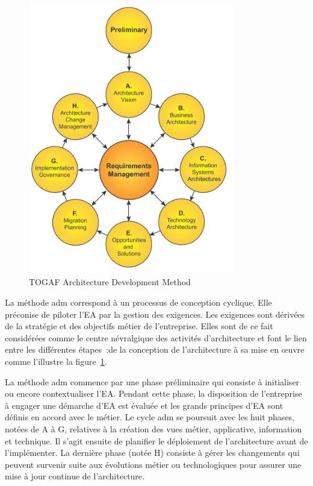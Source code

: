 \begin{figure}[!htbp]
    \begin{center}
    \includegraphics[width=0.8\textwidth]{figures/2_etat_de_l_art_EA/TOGAF9_Wheel.png}
    \end{center}
    \caption{TOGAF Architecture Development Method \protect\cite{togaf2009}}
    \label{fig:TOGAF}
\end{figure}

La méthode \gls{adm} correspond à un processus de conception cyclique. Elle préconise
de piloter l'EA par la gestion des exigences. Les exigences sont dérivées de la
stratégie et des objectifs métier de l'entreprise. Elles sont de ce fait
considérées comme le centre névralgique des activités d'architecture et font le
lien entre les différentes étapes~:de la conception de l'architecture à sa mise
en œuvre comme l'illustre la figure~\ref{fig:TOGAF}. 

La méthode \gls{adm} commence par une phase préliminaire qui consiste à initialiser
ou encore contextualiser l'EA. Pendant cette phase, la disposition de
l'entreprise à engager une démarche d'EA est évaluée et les grands principes
d'EA sont définis en accord avec le métier. Le cycle \gls{adm} se poursuit avec les
huit phases, notées de A à G, relatives à la création des vues métier,
applicative, information et technique. Il s'agit ensuite de planifier le
déploiement de l'architecture avant de l'implémenter. La dernière phase (notée H)
consiste à gérer les changements qui peuvent survenir suite aux évolutions
métier ou technologiques pour assurer une mise à jour continue de
l'architecture. 

